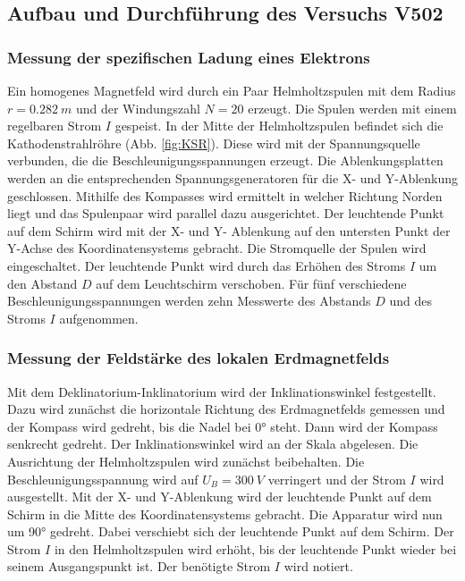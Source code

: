 \subsection{Aufbau und Durchführung des Versuchs V502}
\subsubsection{Messung der spezifischen Ladung eines Elektrons}
Ein homogenes Magnetfeld wird durch ein Paar Helmholtzspulen mit dem Radius $r=\SI{0.282}{m}$ und der Windungszahl $N=20$ erzeugt.
Die Spulen werden mit einem regelbaren Strom $I$ gespeist.
In der Mitte der Helmholtzspulen befindet sich die Kathodenstrahlröhre (Abb. \ref{fig:KSR}).
Diese wird mit der Spannungsquelle verbunden, die die Beschleunigungsspannungen erzeugt.
Die Ablenkungsplatten werden an die entsprechenden Spannungsgeneratoren für die X- und Y-Ablenkung geschlossen.
Mithilfe des Kompasses wird ermittelt in welcher Richtung Norden liegt und das Spulenpaar wird parallel dazu ausgerichtet.
Der leuchtende Punkt auf dem Schirm wird mit der X- und Y- Ablenkung auf den untersten Punkt der Y-Achse des Koordinatensystems gebracht.
Die Stromquelle der Spulen wird eingeschaltet.
Der leuchtende Punkt wird durch das Erhöhen des Stroms $I$ um den Abstand $D$ auf dem Leuchtschirm verschoben.
Für fünf verschiedene Beschleunigungsspannungen werden zehn Messwerte des Abstands $D$ und des Stroms $I$ aufgenommen.

\subsubsection{Messung der Feldstärke des lokalen Erdmagnetfelds}
Mit dem Deklinatorium-Inklinatorium wird der Inklinationswinkel festgestellt.
Dazu wird zunächst die horizontale Richtung des Erdmagnetfelds gemessen und der Kompass wird gedreht, bis die Nadel bei 0° steht.
Dann wird der Kompass senkrecht gedreht.
Der Inklinationswinkel wird an der Skala abgelesen.
Die Ausrichtung der Helmholtzspulen wird zunächst beibehalten.
Die Beschleunigungsspannung wird auf $U_{B}=\SI{300}{V}$ verringert und der Strom $I$ wird ausgestellt.
Mit der X- und Y-Ablenkung wird der leuchtende Punkt auf dem Schirm in die Mitte des Koordinatensystems gebracht.
Die Apparatur wird nun um 90° gedreht.
Dabei verschiebt sich der leuchtende Punkt auf dem Schirm.
Der Strom $I$ in den Helmholtzspulen wird erhöht, bis der leuchtende Punkt wieder bei seinem Ausgangspunkt ist.
Der benötigte Strom $I$ wird notiert.
\FloatBarrier
